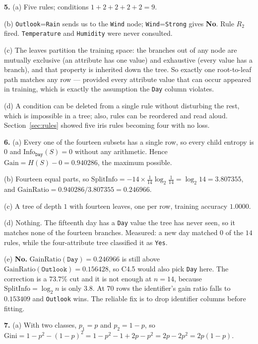 \documentclass[11pt]{article}
\begin{document}
\medskip
\textbf{5.} (a) Five rules; conditions $1 + 2 + 2 + 2 + 2 = 9$.

(b) \texttt{Outlook}=\texttt{Rain} sends us to the \texttt{Wind} node;
\texttt{Wind}=\texttt{Strong} gives \textbf{No}. Rule $R_2$ fired.
\texttt{Temperature} and \texttt{Humidity} were never consulted.

(c) The leaves partition the training space: the branches out of any node are
mutually exclusive (an attribute has one value) and exhaustive (every value
has a branch), and that property is inherited down the tree. So exactly one
root-to-leaf path matches any row --- provided every attribute value that can
occur appeared in training, which is exactly the assumption the \texttt{Day}
column violates.

(d) A condition can be deleted from a single rule without disturbing the rest,
which is impossible in a tree; also, rules can be reordered and read aloud.
Section~\ref{sec:rules} showed five iris rules becoming four with no loss.

\medskip
\textbf{6.} (a) Every one of the fourteen subsets has a single row, so every
child entropy is $0$ and $\mathrm{Info}_{\texttt{Day}}(S) = 0$ without any
arithmetic. Hence
$\mathrm{Gain} = H(S) - 0 = \mathbf{0.940286}$, the maximum possible.

(b) Fourteen equal parts, so
$\mathrm{SplitInfo} = -14 \times \tfrac{1}{14}\log_2\tfrac{1}{14}
= \log_2 14 = 3.807355$, and
$\mathrm{GainRatio} = 0.940286/3.807355 = \mathbf{0.246966}$.

(c) A tree of depth $1$ with fourteen leaves, one per row, training accuracy
$1.0000$.

(d) Nothing. The fifteenth day has a \texttt{Day} value the tree has never
seen, so it matches none of the fourteen branches. Measured: a new day matched
$0$ of the $14$ rules, while the four-attribute tree classified it as
\texttt{Yes}.

(e) \textbf{No.} $\mathrm{GainRatio}(\texttt{Day}) = 0.246966$ is still above
$\mathrm{GainRatio}(\texttt{Outlook}) = 0.156428$, so C4.5 would also pick
\texttt{Day} here. The correction is a $73.7\%$ cut and it is not enough at
$n = 14$, because $\mathrm{SplitInfo} = \log_2 n$ is only $3.8$. At $70$ rows
the identifier's gain ratio falls to $0.153409$ and \texttt{Outlook} wins.
The reliable fix is to drop identifier columns before fitting.

\medskip
\textbf{7.} (a) With two classes, $p_1 = p$ and $p_2 = 1-p$, so
$\mathrm{Gini} = 1 - p^2 - (1-p)^2 = 1 - p^2 - 1 + 2p - p^2 = 2p - 2p^2
= 2p(1-p)$.
\end{document}
